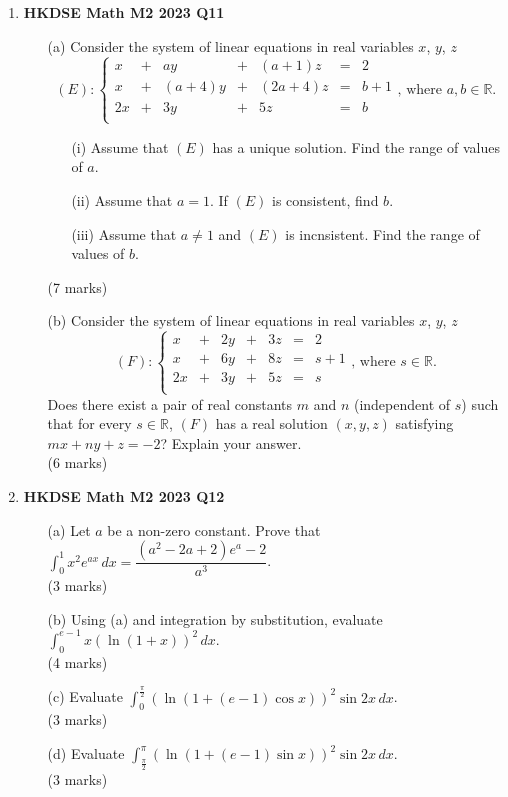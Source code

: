\documentclass{report}
\begin{document}
\begin{enumerate}
	\item \textbf{HKDSE Math M2 2023 Q11}
	\begin{enumerate}
		\item [(a)] Consider the system of linear equations in real variables $x$, $y$, $z$
		$$(E) : \left\{\begin{matrix}
		x&	+&	ay&		+&	(a+1)z&		=&	2  \\
		x&	+&	(a+4)y&	+&	(2a+4)z&	=&	b+1 \\
		2x&	+&	3y&		+&	5z&			=&	b \\
		\end{matrix}\right. \text{,  where } a, b \in \mathbb{R} .$$
		\begin{enumerate}
			\item [(i)] Assume that $(E)$ has a unique solution. Find the range of values of $a$.
			\item [(ii)] Assume that $a = 1$. If $(E)$ is consistent, find $b$.
			\item [(iii)] Assume that $a \neq 1$ and $(E)$ is incnsistent. Find the range of values of $b$.
		\end{enumerate}
		(7 marks)
		\item [(b)] Consider the system of linear equations in real variables $x$, $y$, $z$
		$$(F) : \left\{\begin{matrix}
		x&	+&	2y&	+&	3z&	=&	2  \\
		x&	+&	6y&	+&	8z&	=&	s+1 \\
		2x&	+&	3y&	+&	5z&	=&	s \\
		\end{matrix}\right. \text{,  where } s \in \mathbb{R} .$$
		Does there exist a pair of real constants $m$ and $n$ (independent of $s$) such that for every $s\in\mathbb{R}$, $(F)$ has a real solution $(x,y,z)$ satisfying $mx + ny + z = -2$? Explain your answer. \\(6 marks) 
	\end{enumerate}

	\newpage

	\item \textbf{HKDSE Math M2 2023 Q12}
	\begin{enumerate}
		\item [(a)]Let $a$ be a non-zero constant. Prove that $\displaystyle \int _{0}^{1} x^2e^{ax} \,dx = \dfrac{(a^2 - 2a + 2)e^a - 2}{a^3}$. \\(3 marks)		
		\item [(b)]Using (a) and integration by substitution, evaluate $\displaystyle \int _{0}^{e-1} x(\ln{(1+x)})^2 \,dx $. \\(4 marks)		
		\item [(c)]Evaluate $\displaystyle \int _{0}^{\frac{\pi}{2}} (\ln{(1+(e-1)\cos{x})})^2\sin{2x} \,dx $. \\(3 marks)
		\item [(d)]Evaluate $\displaystyle \int _{\frac{\pi}{2}}^{\pi} (\ln{(1+(e-1)\sin{x})})^2\sin{2x} \,dx $. \\(3 marks)

	\end{enumerate}




\end{enumerate}
\end{document}
